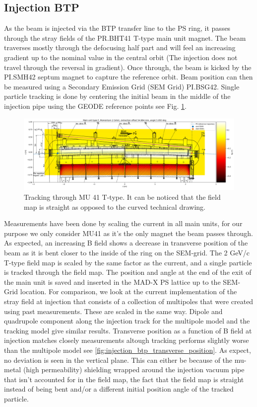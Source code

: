 \documentclass[a4paper,
               biblatex,     %
               keeplastbox,   %
               ]{jacow}
\begin{document}
\subsection{Injection BTP}
As the beam is injected via the BTP transfer line to the PS ring, it passes through the stray fields of the PR.BHT41 T-type main unit magnet. The beam traverses mostly through the defocusing half part and will feel an increasing gradient up to the nominal value in the central orbit (The injection does not travel through the reversal in gradient). Once through, the beam is kicked by the PI.SMH42 septum magnet to capture the reference orbit. Beam position can then be measured using a Secondary Emission Grid (SEM Grid) PI.BSG42. Single particle tracking is done by centering the initial beam in the middle of the injection pipe using the GEODE reference points see Fig. \ref{fig:injection_btp}.

\begin{figure}[!htb]
   \centering
   \includegraphics*[width=1.0\columnwidth]{injection_btp.png}
   \caption{Tracking through MU 41 T-type. It can be noticed that the field map is straight as opposed to the curved technical drawing.}
   \label{fig:injection_btp}
\end{figure}

Measurements have been done by scaling the current in all main units, for our purpose we only consider MU41 as it's the only magnet the beam passes through. As expected, an increasing B field shows a decrease in transverse position of the beam as it is bent closer to the inside of the ring on the SEM-grid. The 2 GeV/c T-type field map is scaled by the same factor as the current, and a single particle is tracked through the field map. The position and angle at the end of the exit of the main unit is saved and inserted in the MAD-X PS lattice up to the SEM-Grid location. For comparison, we look at the current implementation of the stray field at injection that consists of a collection of multipoles that were created using past measurements. These are scaled in the same way. Dipole and quadrupole component along the injection track for the multipole model and the tracking model give similar results. Transverse position as a function of B field at injection matches closely measurements altough tracking performs slightly worse than the multipole model see \ref{fig:injection_btp_transverse_position}. As expect, no deviation is seen in the vertical plane. This can either be because of the mu-metal (high permeability) shielding wrapped around the injection vacuum pipe that isn't accounted for in the field map, the fact that the field map is straight instead of being bent and/or a different initial position angle of the tracked particle.
\end{document}
